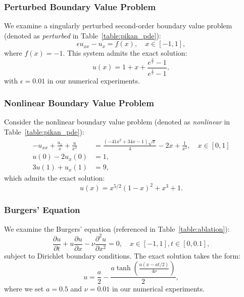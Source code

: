 \subsubsection{Perturbed Boundary Value Problem}
We examine a singularly perturbed second-order boundary value problem (denoted as \textit{perturbed} in Table~\ref{table:pikan_pde}):
\begin{equation}
    \epsilon u_{xx}-u_x=f(x), \quad x \in[-1,1],
\end{equation}
where $f(x)=-1$. This system admits the exact solution:
\begin{equation}
    u(x)=1+x+\frac{e^{\frac{x}{\epsilon}}-1}{e^{\frac{1}{\epsilon}}-1},
\end{equation}
with $\epsilon=0.01$ in our numerical experiments.

\subsubsection{Nonlinear Boundary Value Problem}
Consider the nonlinear boundary value problem (denoted as \textit{nonlinear} in Table~\ref{table:pikan_pde}):
\begin{equation}
\begin{aligned}
        -u_{xx}+\frac{u_x}{x}+\frac{u}{x^2} & =\frac{(-41x^2+34x-1)\sqrt{x}}{4}-2x+\frac{1}{x^2}, \quad x\in[0,1] \\
        u(0)-2u_x(0) & =1,\\
        3u(1)+u_x(1) & =9,
\end{aligned}
\end{equation}
which admits the exact solution:
\begin{equation}
    u(x)=x^{5/2}(1-x)^2+x^3+1.
\end{equation}

\subsubsection{Burgers' Equation}
We examine the Burgers' equation (referenced in Table~\ref{table:ablation}):
\begin{equation}\label{eq:burgers}
\frac{\partial u}{\partial t}+u \frac{\partial u}{\partial x}-\nu \frac{\partial^2 u}{\partial x^2}=0, \quad x\in [-1,1], t\in [0,0.1],
\end{equation}
subject to Dirichlet boundary conditions. The exact solution takes the form:
\begin{equation}
    u=\frac{a}{2} - \frac{a\tanh\left(\frac{a(x - at/2)}{4\nu}\right)}{2},
\end{equation}
where we set $a=0.5$ and $\nu=0.01$ in our numerical experiments.

